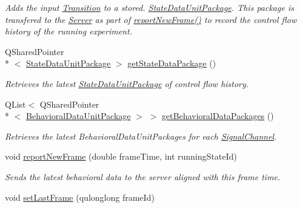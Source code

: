 \begin{DoxyCompactItemize}
\begin{DoxyCompactList}\small\item\em Adds the input \hyperlink{class_picto_1_1_transition}{Transition} to a stored. \hyperlink{class_picto_1_1_state_data_unit_package}{State\-Data\-Unit\-Package}. This package is transfered to the \hyperlink{class_server}{Server} as part of \hyperlink{class_picto_1_1_engine_1_1_picto_engine_a57b618a019ed247129b7fda0a7115e30}{report\-New\-Frame()} to record the control flow history of the running experiment. \end{DoxyCompactList}\item 
Q\-Shared\-Pointer\\*
$<$ \hyperlink{class_picto_1_1_state_data_unit_package}{State\-Data\-Unit\-Package} $>$ \hyperlink{class_picto_1_1_engine_1_1_picto_engine_a1b255d70c4a19541610d77ce02d6ee89}{get\-State\-Data\-Package} ()
\begin{DoxyCompactList}\small\item\em Retrieves the latest \hyperlink{class_picto_1_1_state_data_unit_package}{State\-Data\-Unit\-Package} of control flow history. \end{DoxyCompactList}\item 
Q\-List$<$ Q\-Shared\-Pointer\\*
$<$ \hyperlink{class_picto_1_1_behavioral_data_unit_package}{Behavioral\-Data\-Unit\-Package} $>$ $>$ \hyperlink{class_picto_1_1_engine_1_1_picto_engine_a7ae55bc94c10a78d642115275fe4cd95}{get\-Behavioral\-Data\-Packages} ()
\begin{DoxyCompactList}\small\item\em Retrieves the latest Behavioral\-Data\-Unit\-Packages for each \hyperlink{class_picto_1_1_signal_channel}{Signal\-Channel}. \end{DoxyCompactList}\item 
void \hyperlink{class_picto_1_1_engine_1_1_picto_engine_a57b618a019ed247129b7fda0a7115e30}{report\-New\-Frame} (double frame\-Time, int running\-State\-Id)
\begin{DoxyCompactList}\small\item\em Sends the latest behavioral data to the server aligned with this frame time. \end{DoxyCompactList}\item 
\hypertarget{class_picto_1_1_engine_1_1_picto_engine_a9867511d183491bd8a84b2fc5f24f0a8}{void \hyperlink{class_picto_1_1_engine_1_1_picto_engine_a9867511d183491bd8a84b2fc5f24f0a8}{set\-Last\-Frame} (qulonglong frame\-Id)}\label{class_picto_1_1_engine_1_1_picto_engine_a9867511d183491bd8a84b2fc5f24f0a8}


\end{DoxyCompactItemize}
